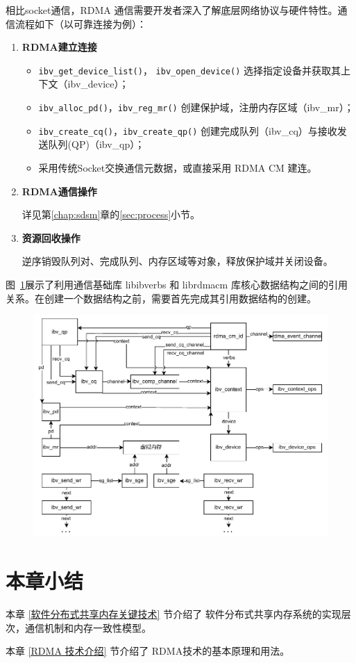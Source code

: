 {    相比socket通信，RDMA 通信需要开发者深入了解底层网络协议与硬件特性。通信流程如下（以可靠连接为例）：
    \begin{enumerate}[label=\textbf{步骤 \arabic*.}, leftmargin=0.5cm, align=left]
        \item \textbf{RDMA建立连接}
              \begin{itemize}
                  \item \texttt{ibv\_get\_device\_list()}， \texttt{ibv\_open\_device()}
                        选择指定设备并获取其上下文（ibv\_device）；
                  \item \texttt{ibv\_alloc\_pd()}，\texttt{ibv\_reg\_mr()} 创建保护域，注册内存区域（ibv\_mr）；
                  \item \texttt{ibv\_create\_cq()}，\texttt{ibv\_create\_qp()} 创建完成队列（ibv\_cq）与接收发送队列(QP)（ibv\_qp）；
                  \item 采用传统Socket交换通信元数据，或直接采用 RDMA CM 建连。
              \end{itemize}

        \item \textbf{RDMA通信操作}

              详见第\ref{chap:sdsm}章的\ref{sec:process}小节。

        \item \textbf{资源回收操作}

              逆序销毁队列对、完成队列、内存区域等对象，释放保护域并关闭设备。
    \end{enumerate}

    图~\ref{fig:RDMA-structs}展示了利用通信基础库 libibverbs 和 librdmacm 库核心数据结构之间的引用关系。在创建一个数据结构之前，需要首先完成其引用数据结构的创建。
    \begin{figure}[!htbp]
        \centering
        \includegraphics[width=\linewidth]{Img/RDMA关键数据结构.drawio.pdf}
        \label{fig:RDMA-structs}
    \end{figure}

    \section{本章小结}

    本章 \ref{软件分布式共享内存关键技术} 节介绍了 软件分布式共享内存系统的实现层次，通信机制和内存一致性模型。

    本章 \ref{RDMA 技术介绍} 节介绍了 RDMA技术的基本原理和用法。
}